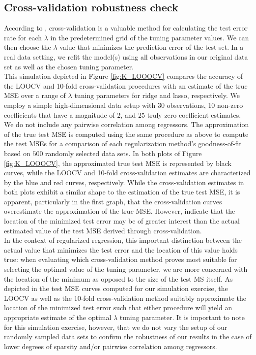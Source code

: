 \subsection{Cross-validation robustness check}
\label{section:cvsim}

\noindent According to \cite{james2013introduction}, cross-validation is a valuable method for calculating the test error rate for each $\lambda$ in the predetermined grid of the tuning parameter values. We can then choose the $\lambda$ value that minimizes the prediction error of the test set. In a real data setting, we refit the model(s) using all observations in our original data set as well as the chosen tuning parameter.  \\    

\noindent This simulation depicted in Figure \ref{fig:K_LOOOCV} compares the accuracy of the LOOCV and 10-fold cross-validation procedures with an estimate of the true MSE over a range of $\lambda$ tuning parameters for ridge and lasso, respectively. We employ a simple high-dimensional data setup with $30$ observations, $10$ non-zero coefficients that have a magnitude of $2$, and $25$ truly zero coefficient estimates. We do not include any pairwise correlation among regressors. The approximation of the true test MSE is computed using the same procedure as above to compute the test MSEs for a comparison of each regularization method's goodness-of-fit based on $500$ randomly selected data sets. In both plots of Figure \ref{fig:K_LOOOCV}, the approximated true test MSE is represented by black curves, while the LOOCV and 10-fold cross-validation estimates are characterized by the blue and red curves, respectively. While the cross-validation estimates in both plots exhibit a similar shape to the estimation of the true test MSE, it is apparent, particularly in the first graph, that the cross-validation curves overestimate the approximation of the true MSE. However, \cite{james2013introduction} indicate that the location of the minimized test error may be of greater interest than the actual estimated value of the test MSE derived through cross-validation.  \\

\noindent In the context of regularized regression, this important distinction between the actual value that minimizes the test error and the location of this value holds true: when evaluating which cross-validation method proves most suitable for selecting the optimal value of the tuning parameter, we are more concerned with the location of the minimum as opposed to the size of the test MS itself. As depicted in the test MSE curves computed for our simulation exercise, the LOOCV as well as the 10-fold cross-validation method suitably approximate the location of the minimized test error such that either procedure will yield an appropriate estimate of the optimal $\lambda$ tuning parameter. It is important to note for this simulation exercise, however, that we do not vary the setup of our randomly sampled data sets to confirm the robustness of our results in the case of lower degrees of sparsity and/or pairwise correlation among regressors.    

